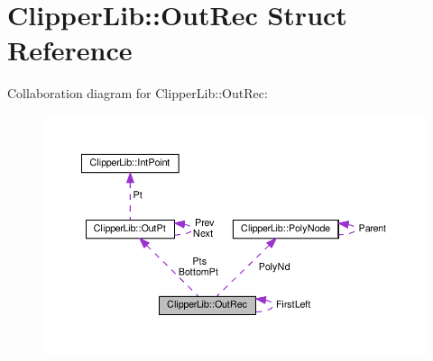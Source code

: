 \hypertarget{struct_clipper_lib_1_1_out_rec}{}\section{Clipper\+Lib\+:\+:Out\+Rec Struct Reference}
\label{struct_clipper_lib_1_1_out_rec}


Collaboration diagram for Clipper\+Lib\+:\+:Out\+Rec\+:
\nopagebreak
\begin{figure}[H]
\begin{center}
\leavevmode
\includegraphics[width=350pt]{struct_clipper_lib_1_1_out_rec__coll__graph}
\end{center}
\end{figure}
